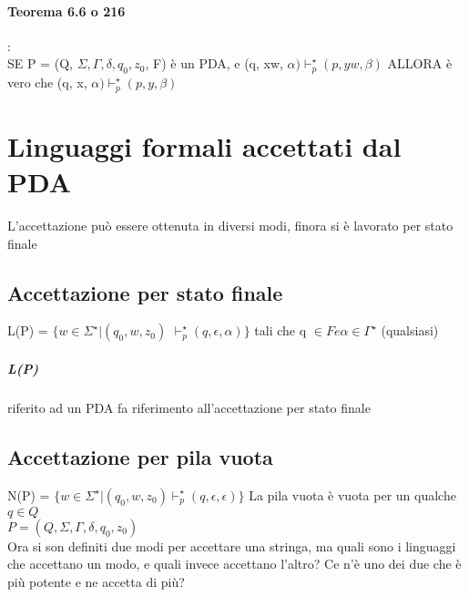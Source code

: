 \documentclass[12pt, a4paper, openany, oneside]{book}
\begin{document}
\paragraph{Teorema 6.6 o 216}:\\
SE P = (Q, $\Sigma, \Gamma, \delta, q_{0}, z_{0}$, F) è un PDA, e (q, xw, $\alpha)
\vdash^{\star}_{p} (p, yw, \beta)$ ALLORA è vero che (q, x, $\alpha)\vdash^{\star}_{p}(p,y,\beta) $
\section{Linguaggi formali accettati dal PDA}
L'accettazione può essere ottenuta in diversi modi, finora si è lavorato per 
stato finale
\subsection{Accettazione per \textbf{stato finale}}
L(P) = $\{w \in \Sigma^{\star} | (q_{0}, w, z_{0})$ $\vdash^{\star}_{p} (q, \epsilon
, \alpha)\}$ tali che q $\in F e \alpha \in \Gamma^{\star}$ (qualsiasi)
\subparagraph{L(P)} riferito ad un PDA fa riferimento all'accettazione per stato
finale	
\subsection{Accettazione per \textbf{pila vuota}}
N(P) = $\{w \in \Sigma^{\star} | (q_{0}, w, z_{0}) \vdash^{\star}_{p} (q, 
\epsilon, \epsilon)\}$
La pila vuota è vuota per un qualche $q \in Q$\\
$P = (Q, \Sigma, \Gamma, \delta, q_{0}, z_{0})$\\
Ora si son definiti due modi per accettare una stringa, ma quali sono i linguaggi
che accettano un modo, e quali invece accettano l'altro? Ce n'è uno dei due che
è più potente e ne accetta di più? 
\end{document}
